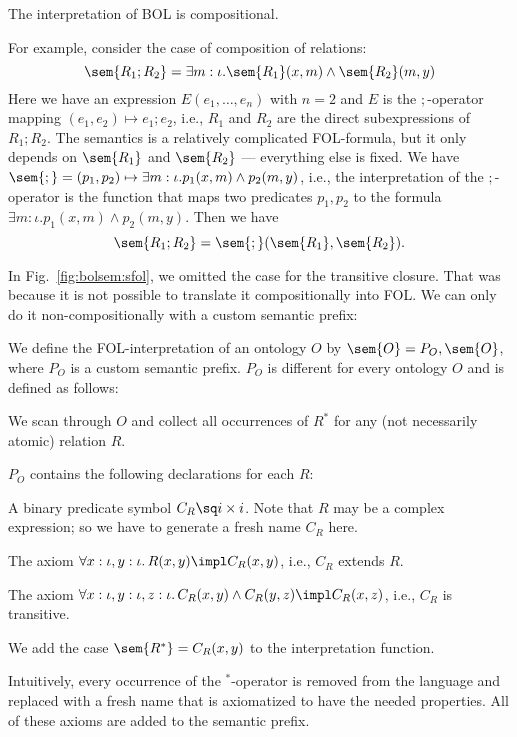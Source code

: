 \begin{example}[Compositionality]\label{ex:compositional}
The interpretation of BOL is compositional.

For example, consider the case of composition of relations:
 \[\sem{R_1 ; R_2}= \exists m:\iota.\sem{R_1}(x,m)\wedge \sem{R_2}(m,y)\]
Here we have an expression $E(e_1,\ldots,e_n)$ with $n=2$ and $E$ is the $;$-operator mapping $(e_1,e_2)\mapsto e_1;e_2$, i.e., $R_1$ and $R_2$ are the direct subexpressions of $R_1;R_2$.
The semantics is a relatively complicated FOL-formula, but it only depends on $\sem{R_1}$ and $\sem{R_2}$ --- everything else is fixed.
We have $\sem{;}=(p_1,p_2)\mapsto \exists m:\iota.p_1(x,m)\wedge p_2(m,y)$, i.e., the interpretation of the $;$-operator is the function that maps two predicates $p_1,p_2$ to the formula $\exists m:\iota.p_1(x,m)\wedge p_2(m,y)$.
Then we have \[\sem{R_1;R_2}=\sem{;}(\sem{R_1},\sem{R_2}).\]
\end{example}

\begin{example}\label{ex:noncompositional}
In Fig.~\ref{fig:bolsem:sfol}, we omitted the case for the transitive closure.
That was because it is not possible to translate it compositionally into FOL.
We can only do it non-compositionally with a custom semantic prefix:

We define the FOL-interpretation of an ontology $O$ by $\sem{O}=P_O,\sem{O}$, where $P_O$ is a custom semantic prefix.
$P_O$ is different for every ontology $O$ and is defined as follows:

\begin{compactenum}
 \item We scan through $O$ and collect all occurrences of $R^*$ for any (not necessarily atomic) relation $R$.
 \item $P_O$ contains the following declarations for each $R$:
  \begin{compactitem}
  \item A binary predicate symbol $C_R\sq i\times i$. Note that $R$ may be a complex expression; so we have to generate a fresh name $C_R$ here.
  \item The axiom $\forall x:\iota,y:\iota.\,R(x,y)\impl C_R(x,y)$, i.e., $C_R$ extends $R$.
  \item The axiom $\forall x:\iota,y:\iota,z:\iota.\,C_R(x,y)\wedge C_R(y,z)\impl C_R(x,z)$, i.e., $C_R$ is transitive.
  \end{compactitem}
 \item We add the case $\sem{R^*}=C_R(x,y)$ to the interpretation function.
\end{compactenum}

Intuitively, every occurrence of the $^*$-operator is removed from the language and replaced with a fresh name that is axiomatized to have the needed properties.
All of these axioms are added to the semantic prefix.
\end{example}

